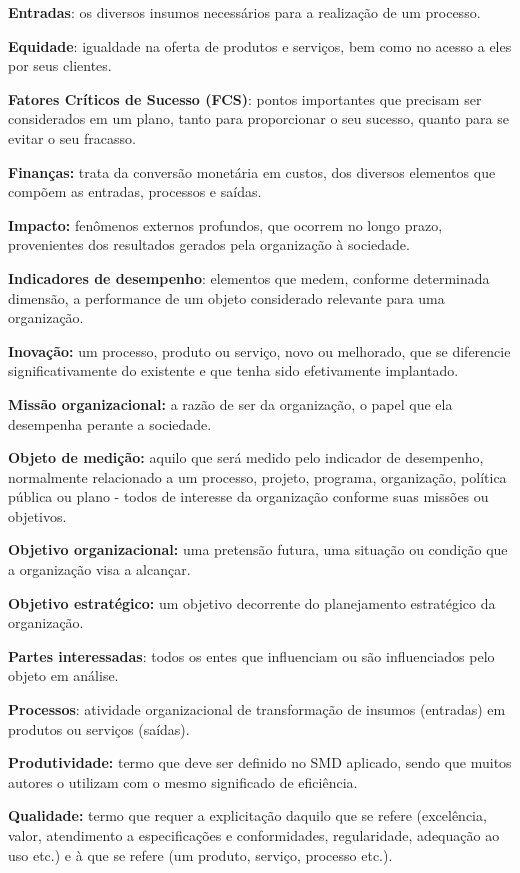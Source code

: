 \documentclass[
  letterpaper,
  DIV=11,
  numbers=noendperiod]{scrreprt}
\begin{document}
\textbf{Entradas}: os diversos insumos necessários para a realização de
um processo.

\textbf{Equidade}: igualdade na oferta de produtos e serviços, bem como
no acesso a eles por seus clientes.

\textbf{Fatores Críticos de Sucesso (FCS)}: pontos importantes que
precisam ser considerados em um plano, tanto para proporcionar o seu
sucesso, quanto para se evitar o seu fracasso.

\textbf{Finanças:} trata da conversão monetária em custos, dos diversos
elementos que compõem as entradas, processos e saídas.

\textbf{Impacto:} fenômenos externos profundos, que ocorrem no longo
prazo, provenientes dos resultados gerados pela organização à sociedade.

\textbf{Indicadores de desempenho}: elementos que medem, conforme
determinada dimensão, a performance de um objeto considerado relevante
para uma organização.

\textbf{Inovação:} um processo, produto ou serviço, novo ou melhorado,
que se diferencie significativamente do existente e que tenha sido
efetivamente implantado.

\textbf{Missão organizacional:} a razão de ser da organização, o papel
que ela desempenha perante a sociedade.

\textbf{Objeto de medição:} aquilo que será medido pelo indicador de
desempenho, normalmente relacionado a um processo, projeto, programa,
organização, política pública ou plano - todos de interesse da
organização conforme suas missões ou objetivos.

\textbf{Objetivo organizacional:} uma pretensão futura, uma situação ou
condição que a organização visa a alcançar.

\textbf{Objetivo estratégico:} um objetivo decorrente do planejamento
estratégico da organização.

\textbf{Partes interessadas}: todos os entes que influenciam ou são
influenciados pelo objeto em análise.

\textbf{Processos}: atividade organizacional de transformação de insumos
(entradas) em produtos ou serviços (saídas).

\textbf{Produtividade:} termo que deve ser definido no SMD aplicado,
sendo que muitos autores o utilizam com o mesmo significado de
eficiência.

\textbf{Qualidade:} termo que requer a explicitação daquilo que se
refere (excelência, valor, atendimento a especificações e conformidades,
regularidade, adequação ao uso etc.) e à que se refere (um produto,
serviço, processo etc.).
\end{document}
